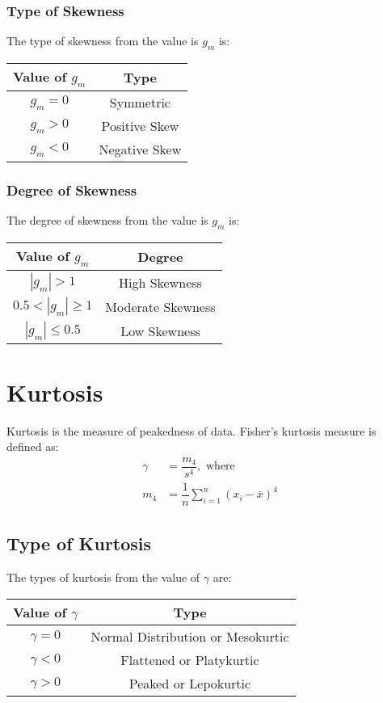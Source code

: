 \documentclass[../main.tex]{subfile}
\begin{document}
    \subsubsection{Type of Skewness}
    The type of skewness from the value is $g_m$ is:
    \begin{table}[h!]
        \centering
        \begin{tabular}{c|c}
            Value of $g_m$ & Type\\
            \hline
            $g_m = 0$ & Symmetric\\
            $g_m > 0$ & Positive Skew\\
            $g_m < 0$ & Negative Skew
        \end{tabular}
    \end{table}

    \subsubsection{Degree of Skewness}
    The degree of skewness from the value is $g_m$ is:
    \begin{table}[h!]
        \centering
        \begin{tabular}{c|c}
            Value of $g_m$ & Degree\\
            \hline
            $|g_m| > 1$ & High Skewness\\
            $0.5 <|g_m| \geq 1$ & Moderate Skewness\\
            $|g_m| \leq 0.5$ & Low Skewness
        \end{tabular}
    \end{table}

    \section{Kurtosis}
    Kurtosis is the measure of peakedness of data. Fisher's kurtosis measure is defined as:
    \begin{align}
        \gamma &= \dfrac{m_4}{s^4}, \text{ where}\\
        m_4 &= \dfrac{1}{n}\sum_{i=1}^{n} \left( x_i - \bar{x} \right)^4
    \end{align}

    \subsection{Type of Kurtosis}
    The types of kurtosis from the value of $\gamma$ are:
    \begin{table}[h!]
        \centering
        \begin{tabular}{c|c}
            Value of $\gamma$ & Type\\
            \hline
            $\gamma = 0$ & Normal Distribution or Mesokurtic\\
            $\gamma < 0$ & Flattened or Platykurtic\\
            $\gamma > 0$ & Peaked or Lepokurtic
        \end{tabular}
    \end{table}
\end{document}

